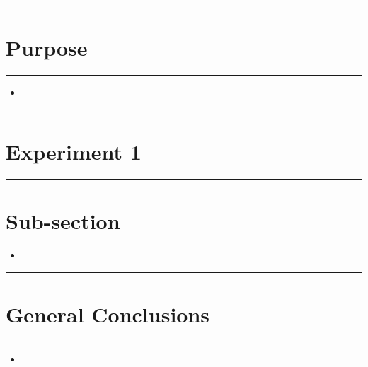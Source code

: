\documentclass[hidelinks, 11pt, dvipsnames]{article}
\title{  } %
\author{  } %
\newcommand{\reportsection}[1]{{
    \begin{center}
        \noindent \rule{17cm}{0.4pt}
            \section*{\LARGE #1}
        \noindent \rule{17cm}{0.4pt}
    \end{center}
}}
\newcommand{\reportsubsection}[1]{{\section*{#1}}}
\begin{document}
    \maketitle

    \newpage

    \reportsection{Purpose}

    \begin{itemize}
        \item 
    \end{itemize}

    \newpage

    \reportsection{Experiment 1}

    \reportsubsection{Sub-section}


    \begin{itemize}
        \item 
    \end{itemize}

    \newpage

    \reportsection{General Conclusions}

    \begin{itemize}
        \item 
    \end{itemize}
\end{document}
